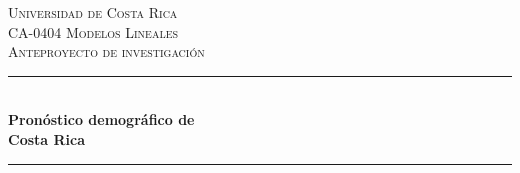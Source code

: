 %
%
%
% 


	\newcommand{\HRule}{\rule{\linewidth}{0.5mm}} %
	
	\center %
	
	
	\textsc{\LARGE Universidad de Costa Rica}\\[1.5cm] %
	
	\textsc{\Large CA-0404 Modelos Lineales}\\[0.5cm] %
	
\textsc{\large Anteproyecto de investigación}\\[0.5cm] %

	
	\HRule\\[0.4cm]
	
	{\huge\bfseries Pronóstico demográfico de\\ Costa Rica}\\[0.4cm] %
	
	\HRule\\[1.5cm]
	
% 
	
